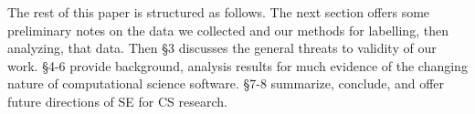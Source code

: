 \documentclass[sigconf]{acmart}
\newcommand{\bi}{\begin{itemize}}
\begin{document}
The rest of this paper is structured as follows.
The next section offers some preliminary notes on the data
we collected and our methods for labelling, then analyzing,
that data. Then \S3 discusses the general threats to validity of our work. \S4-6 provide background, analysis results for much evidence
of the changing nature of computational science software. \S7-8 summarize, conclude, and offer future directions of SE for CS research. 




\end{document}
